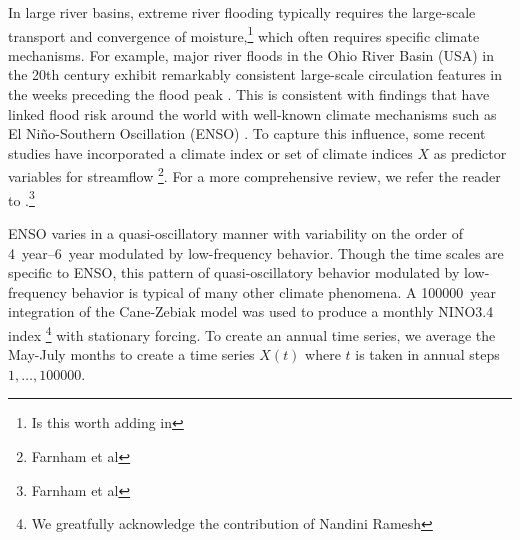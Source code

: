 \documentclass[11pt]{article}
\begin{document}
In large river basins, extreme river flooding typically requires the large-scale transport and convergence of moisture,\footnote{Is this worth adding in} which often requires specific climate mechanisms.
For example, major river floods in the Ohio River Basin (USA) in the 20th century exhibit remarkably consistent large-scale circulation features in the weeks preceding the flood peak \citep{Nakamura2012,Robertson2015}.
This is consistent with findings that have linked flood risk around the world with well-known climate mechanisms such as El Ni\~{n}o-Southern Oscillation (ENSO) \citep{Ward2014,Emerton2017}.
To capture this influence, some recent studies have incorporated a climate index or set of climate indices $X$ as predictor variables for streamflow \citep{Delgado2014,Silva2016,Sun2014,Griffis2007}\footnote{Farnham et al}.
For a more comprehensive review, we refer the reader to \citet{Hall2014}.\footnote{Farnham et al}

ENSO \citep[see][for a comprehensive review]{Sarachik2010} varies in a quasi-oscillatory manner with variability on the order of \SIrange{4}{6}{year} modulated by low-frequency behavior.
Though the time scales are specific to ENSO, this pattern of quasi-oscillatory behavior modulated by low-frequency behavior is typical of many other climate phenomena.
A \SI{100000}{year} integration of the Cane-Zebiak model \citep{Zebiak1987} was used to produce a monthly NINO3.4 index \footnote{We greatfully acknowledge the contribution of Nandini Ramesh} with stationary forcing.
To create an annual time series, we average the May-July months to create a time series $X(t)$ where $t$ is taken in annual steps $1, \ldots, \num{100000}$.
\end{document}
